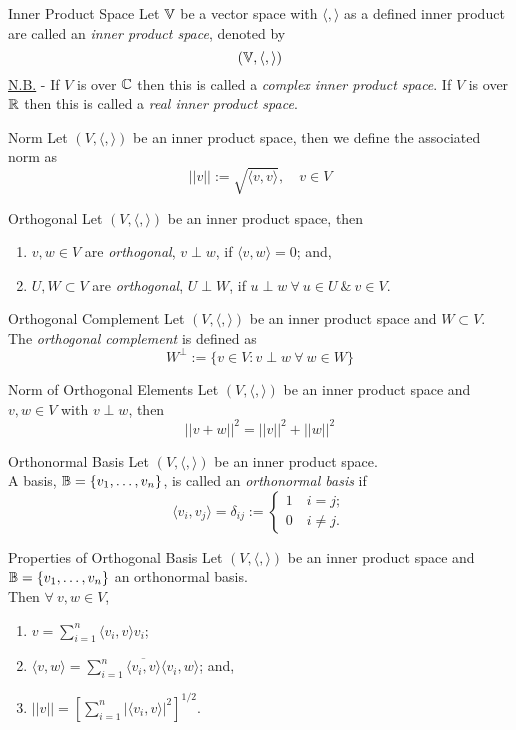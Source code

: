 \documentclass[11pt,a4paper]{article}
\begin{document}
\subtitle{Definition 9.03 - }{Inner Product Space}
Let $\mathbb{V}$ be a vector space with $\langle , \rangle$ as a defined inner product are called an \textit{inner product space}, denoted by
$$(\mathbb{V}, \langle , \rangle)$$
\underline{N.B.} - If $V$ is over $\mathbb{C}$ then this is called a \textit{complex inner product space}. If $V$ is over $\mathbb{R}$ then this is called a \textit{real inner product space}.\\

\subtitle{Definition 9.04 - }{Norm}
Let $( V , \langle , \rangle )$ be an inner product space, then we define the associated norm as
$$||v|| := \sqrt{\langle v, v \rangle},\quad v \in V$$

\subtitle{Definition 9.05 - }{Orthogonal}
Let $(V , \langle , \rangle)$ be an inner product space, then
\begin{enumerate}[label=\roman*)]
  \item $v, w \in V$ are \textit{orthogonal}, $v \perp w$, if $\langle v, w \rangle = 0$; and,
  \item $U, W \subset V$ are \textit{orthogonal}, $U \perp W$, if $u \perp w\ \forall\ u \in U\ \&\ v \in V$.
\end{enumerate}

\subtitle{Definition 9.06 - }{Orthogonal Complement}
Let $(V, \langle , \rangle)$ be an inner product space and $W \subset V$.\\
The \textit{orthogonal complement} is defined as
$$W^\perp := \{ v \in V : v \perp w\ \forall\ w \in W \}$$

\subtitle{Theorem 9.07 - }{Norm of Orthogonal Elements}
Let $(V, \langle , \rangle)$ be an inner product space and $v, w \in V$ with $v \perp w$, then
$$||v + w||^2 = ||v||^2 + ||w||^2$$

\subtitle{Definition 9.08 - }{Orthonormal Basis}
Let $(V, \langle , \rangle)$ be an inner product space.\\
A basis, $\mathbb{B} = \{ v_1 , \dots , v_n\}$, is called an \textit{orthonormal basis} if
$$\langle v_i , v_j \rangle = \delta_{ij} := \begin{cases} 1 \quad i = j;\\ 0 \quad i \not = j. \end{cases}$$

\subtitle{Theorem 9.09 - }{Properties of Orthogonal Basis}
Let $(V, \langle , \rangle)$ be an inner product space and $\mathbb{B} = \{ v_1 , \dots , v_n\}$ an orthonormal basis.\\
Then $\forall\ v, w \in V$,
\begin{enumerate}[label=\roman*)]
  \item $v = \sum_{i=1}^n \langle v_i , v \rangle v_i$;
  \item $\langle v , w \rangle = \sum_{i=1}^n \overline{\langle v_i, v \rangle}\langle v_i, w \rangle$; and,
  \item $||v|| = \left[\sum_{i=1}^n |\langle v_i, v \rangle|^2\right]^{1/2} $.
\end{enumerate}
\end{document}
